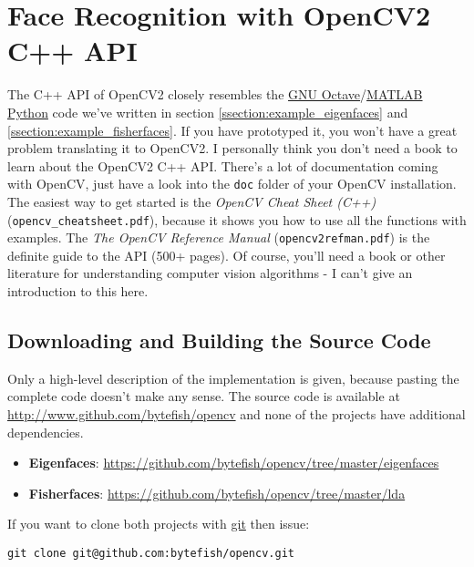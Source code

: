 \section{Face Recognition with OpenCV2 C++ API}

The C++ API of OpenCV2 closely resembles the \ifx\python\undefined \href{http://www.gnu.org/software/octave/}{GNU Octave}/\href{http://www.mathworks.com}{MATLAB} \else \href{http://www.python.org}{Python} \fi code we've written in section \ref{ssection:example_eigenfaces} and \ref{ssection:example_fisherfaces}. If you have prototyped it, you won't have a great problem translating it to OpenCV2. I personally think you don't need a book to learn about the OpenCV2 C++ API. There's a lot of documentation coming with OpenCV, just have a look into the \lstinline|doc| folder of your OpenCV installation. The easiest way to get started is the \textit{OpenCV Cheat Sheet (C++)} (\lstinline|opencv_cheatsheet.pdf|), because it shows you how to use all the functions with examples. The \textit{The OpenCV Reference Manual} (\lstinline|opencv2refman.pdf|) is the definite guide to the API (500+ pages). Of course, you'll need a book or other literature for understanding computer vision algorithms - I can't give an introduction to this here.

\subsection{Downloading and Building the Source Code}

Only a high-level description of the implementation is given, because pasting the complete code doesn't make any sense. The source code is available at \url{http://www.github.com/bytefish/opencv} and none of the projects have additional dependencies.

\begin{itemize}
	\item \textbf{Eigenfaces}: \url{https://github.com/bytefish/opencv/tree/master/eigenfaces}
	\item \textbf{Fisherfaces}: \url{https://github.com/bytefish/opencv/tree/master/lda}
\end{itemize}

If you want to clone both projects with \href{http://git-scm.com/}{git} then issue:

\begin{lstlisting}
git clone git@github.com:bytefish/opencv.git
\end{lstlisting}

